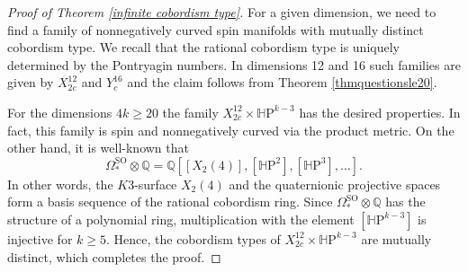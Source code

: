 \documentclass[10pt,a4paper]{amsart}
\theoremstyle{thm}
\theoremstyle{text}
\begin{document}
\begin{proof}[Proof of Theorem \ref{infinite cobordism type}]
For a given dimension, we need to find a family of nonnegatively curved spin manifolds with mutually distinct cobordism type. We recall that the rational cobordism type is uniquely determined by the Pontryagin numbers. In dimensions 12 and 16 such families are given by $X^{12}_{2c}$ and $Y^{16}_c$ and the claim follows from Theorem \ref{thmquestionsle20}.

For the dimensions $4k \geq 20$ the family $X^{12}_{2c} \times {\mathbb{H}\mathrm{P}}^{k-3}$ has the desired properties. In fact, this family is spin and nonnegatively curved via the product metric. On the other hand, it is  well-known that
\[ \Omega_{\ast}^{\textrm{SO}} \otimes {\mathbb{Q}} = {\mathbb{Q}}[[X_2(4)], [{\mathbb{H}\mathrm{P}}^2], [{\mathbb{H}\mathrm{P}}^3], \ldots].\]
In other words, the $K3$-surface $X_2(4)$ and the quaternionic projective spaces form a basis sequence of the rational cobordism ring. Since $\Omega_{\ast}^{\textrm{SO}} \otimes {\mathbb{Q}}$ has the structure of a polynomial ring, multiplication with the element $[{\mathbb{H}\mathrm{P}}^{k-3}]$ is injective for $k \geq 5$. Hence, the cobordism types of $X^{12}_{2c} \times {\mathbb{H}\mathrm{P}}^{k-3}$ are mutually distinct, which completes the proof.
\end{proof}
   



 
\end{document}

